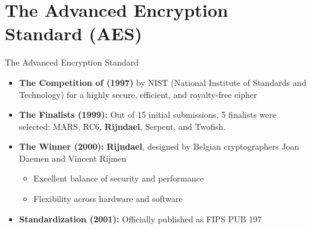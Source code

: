 \documentclass{cubeamer}
\begin{document}
\section{The Advanced Encryption Standard (AES)}
\begin{frame}{The Advanced Encryption Standard}
    \begin{itemize}
    \item \textbf{The Competition of (1997)} by NIST (National Institute of Standards and Technology) for a highly secure, efficient, and royalty-free cipher
   \pause
   \item \textbf{The Finalists (1999):} Out of 15 initial submissions, 5 finalists were selected: MARS, RC6, \textbf{Rijndael}, Serpent, and Twofish.
   \pause
   \item \textbf{The Winner (2000):} \textbf{Rijndael}, designed by Belgian cryptographers Joan Daemen and Vincent Rijmen
       \begin{itemize} 
           \item Excellent balance of security and performance 
           \item Flexibility across hardware and software
       \end{itemize}
   \pause
   \item \textbf{Standardization (2001):} Officially published as FIPS PUB 197
    \end{itemize}
\end{frame}
\end{document}
